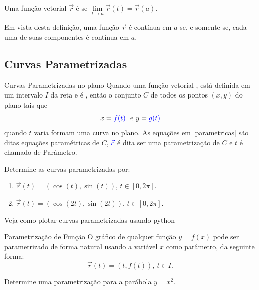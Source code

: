\begin{frame}[label=fun-vet]
\begin{defin}
Uma função vetorial $\vec{r}$ é  se $\lim\limits_{t\to a}\vec{r}(t)=\vec{r}(a)$.
\end{defin}
Em vista desta definição, uma função $\vec{r}$ é {\color{blue}contínua em $a$} se, e somente se, cada uma de suas {\color{blue}componentes é contínua em $a$}.



\end{frame}

\subsection*{Curvas Parametrizadas}
\begin{frame}[label=fun-vet]{Curvas Parametrizadas no plano}
Quando uma função vetorial , está definida em um intervalo $I$ da reta e  é , então o conjunto {\color{red}$C$} de todos os pontos $(x,y)$ do plano tais que
\begin{equation}\label{parametricas}
x={\color{blue}f(t)}\ \text{ e } y={\color{blue}g(t)}
\end{equation}
quando $t$ varia formam uma {\color{red}curva no plano}. As equações em  {\color{red} \eqref{parametricas}} são ditas {\color{red} equações paramétricas de $C$}, ${\color{blue}\vec{r}}$ é dita ser uma {\color{red}parametrização de $C$} e $t$ é chamado de  {\color{red} Parâmetro}.
\begin{exe}
Determine as curvas parametrizadas por:
\begin{enumerate} 
\item $\vec{r}(t)=(\cos(t),\sin(t))$, $t\in [0,2\pi]$.
\item $\vec{r}(t)=(\cos(2t),\sin(2t))$, $t\in [0,2\pi]$.

\end{enumerate}
\end{exe}

Veja como plotar curvas parametrizadas usando python \href{https://reginaldodr.github.io/academic/posts/curvas-parametricas/curvas-parametricas.html}{}

\end{frame}

\begin{frame}[label=fun-vet]
\begin{block}{Parametrização de Função}
O gráfico de qualquer função $y=f(x)$ pode ser parametrizado de forma natural usando a variável $x$ como parâmetro, da seguinte forma:
\[\vec{r}(t)=(t,f(t)),\ t\in I.\]
\end{block}

\begin{exer}
 Determine uma parametrização para a parábola $y=x^2$.
\end{exer}
\end{frame}


